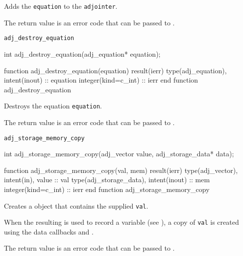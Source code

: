 Adds the \texttt{equation} to the \texttt{adjointer}.

The return value is an error code that can be passed to .


\begin{boxwithtitle}{\texttt{adj_destroy_equation}}
\begin{minipage}{\columnwidth}
\begin{ccode}
  int adj_destroy_equation(adj_equation* equation);
\end{ccode}
\begin{fortrancode}
  function adj_destroy_equation(equation) result(ierr)
    type(adj_equation), intent(inout) :: equation
    integer(kind=c_int) :: ierr
  end function adj_destroy_equation
\end{fortrancode}
\end{minipage}
\end{boxwithtitle}

Destroys the equation \texttt{equation}.

The return value is an error code that can be passed to .


\begin{boxwithtitle}{\texttt{adj_storage_memory_copy}}
\begin{minipage}{\columnwidth}
\begin{ccode}
  int adj_storage_memory_copy(adj_vector value, adj_storage_data* data);
\end{ccode}
\begin{fortrancode}
  function adj_storage_memory_copy(val, mem) result(ierr)
    type(adj_vector), intent(in), value :: val
    type(adj_storage_data), intent(inout) :: mem
    integer(kind=c_int) :: ierr
  end function adj_storage_memory_copy
\end{fortrancode}
\end{minipage}
\end{boxwithtitle}
Creates a  object that contains the supplied  \texttt{val}.

When the resulting  is used to record a variable (see ), 
a copy of \texttt{val} is created using the data callbacks  and .

The return value is an error code that can be passed to .

